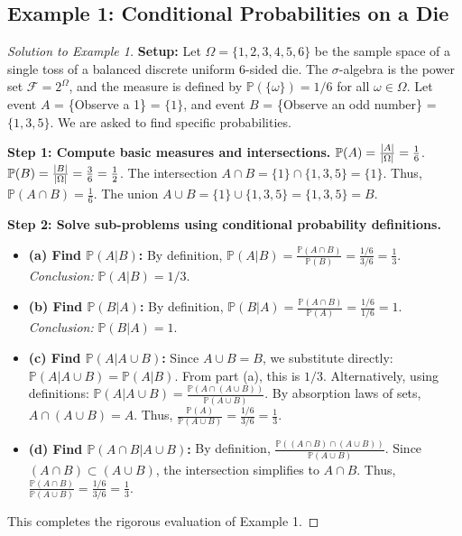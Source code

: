 \documentclass[12pt, a4paper]{article}
\theoremstyle{definition}
\theoremstyle{remark}
\newcommand{\Prob}{\mathbb{P}}
\newcommand{\F}{\mathcal{F}}
\newcommand{\W}{\Omega}
\newcommand{\1}{\mathbf{1}}
\DeclarePairedDelimiter{\abs}{\lvert}{\rvert}
\begin{document}
\subsection*{Example 1: Conditional Probabilities on a Die}
\begin{proof}[Solution to Example 1]
\textbf{Setup:} Let $\W = \{1, 2, 3, 4, 5, 6\}$ be the sample space of a single toss of a balanced discrete uniform 6-sided die. The $\sigma$-algebra is the power set $\F = 2^\W$, and the measure is defined by $\Prob(\{\omega\}) = 1/6$ for all $\omega \in \W$. 
Let event $A$ = \{Observe a 1\} = $\{1\}$, and event $B$ = \{Observe an odd number\} = $\{1, 3, 5\}$.
We are asked to find specific probabilities.

\textbf{Step 1: Compute basic measures and intersections.}
$\Prob(A) = \frac{\abs{A}}{\abs{\W}} = \frac{1}{6}$.
$\Prob(B) = \frac{\abs{B}}{\abs{\W}} = \frac{3}{6} = \frac{1}{2}$.
The intersection $A \cap B = \{1\} \cap \{1, 3, 5\} = \{1\}$. Thus, $\Prob(A \cap B) = \frac{1}{6}$.
The union $A \cup B = \{1\} \cup \{1, 3, 5\} = \{1, 3, 5\} = B$.

\textbf{Step 2: Solve sub-problems using conditional probability definitions.}
\begin{itemize}[leftmargin=*]
    \item \textbf{(a) Find $\Prob(A|B)$:} 
    By definition, $\Prob(A|B) = \frac{\Prob(A \cap B)}{\Prob(B)} = \frac{1/6}{3/6} = \frac{1}{3}$. 
    \textit{Conclusion:} $\Prob(A|B) = 1/3$.
    
    \item \textbf{(b) Find $\Prob(B|A)$:}
    By definition, $\Prob(B|A) = \frac{\Prob(A \cap B)}{\Prob(A)} = \frac{1/6}{1/6} = 1$. 
    \textit{Conclusion:} $\Prob(B|A) = 1$.
    
    \item \textbf{(c) Find $\Prob(A | A \cup B)$:}
    Since $A \cup B = B$, we substitute directly: $\Prob(A | A \cup B) = \Prob(A | B)$. From part (a), this is $1/3$.
    Alternatively, using definitions: $\Prob(A | A \cup B) = \frac{\Prob(A \cap (A \cup B))}{\Prob(A \cup B)}$. By absorption laws of sets, $A \cap (A \cup B) = A$. 
    Thus, $\frac{\Prob(A)}{\Prob(A \cup B)} = \frac{1/6}{3/6} = \frac{1}{3}$.
    
    \item \textbf{(d) Find $\Prob(A \cap B | A \cup B)$:}
    By definition, $\frac{\Prob((A \cap B) \cap (A \cup B))}{\Prob(A \cup B)}$. Since $(A \cap B) \subset (A \cup B)$, the intersection simplifies to $A \cap B$. 
    Thus, $\frac{\Prob(A \cap B)}{\Prob(A \cup B)} = \frac{1/6}{3/6} = \frac{1}{3}$.
\end{itemize}
This completes the rigorous evaluation of Example 1.
\end{proof}
\end{document}
